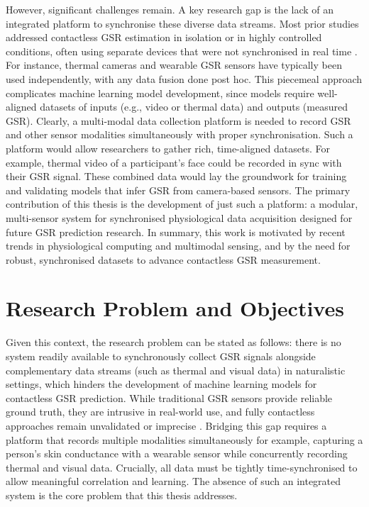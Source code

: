 However, significant challenges remain. A key research gap is the lack of an integrated platform to synchronise these diverse data streams. Most prior studies addressed contactless GSR estimation in isolation or in highly controlled conditions, often using separate devices that were not synchronised in real time \citep{ref7}. For instance, thermal cameras and wearable GSR sensors have typically been used independently, with any data fusion done post hoc. This piecemeal approach complicates machine learning model development, since models require well-aligned datasets of inputs (e.g., video or thermal data) and outputs (measured GSR). Clearly, a multi-modal data collection platform is needed to record GSR and other sensor modalities simultaneously with proper synchronisation. Such a platform would allow researchers to gather rich, time-aligned datasets. For example, thermal video of a participant's face could be recorded in sync with their GSR signal. These combined data would lay the groundwork for training and validating models that infer GSR from camera-based sensors. The primary contribution of this thesis is the development of just such a platform: a modular, multi-sensor system for synchronised physiological data acquisition designed for future GSR prediction research. In summary, this work is motivated by recent trends in physiological computing and multimodal sensing, and by the need for robust, synchronised datasets to advance contactless GSR measurement.


\section{Research Problem and Objectives}
Given this context, the research problem can be stated as follows: there is no system readily available to synchronously collect GSR signals alongside complementary data streams (such as thermal and visual data) in naturalistic settings, which hinders the development of machine learning models for contactless GSR prediction. While traditional GSR sensors provide reliable ground truth, they are intrusive in real-world use, and fully contactless approaches remain unvalidated or imprecise \citep{ref8}. Bridging this gap requires a platform that records multiple modalities simultaneously \textemdash for example, capturing a person's skin conductance with a wearable sensor while concurrently recording thermal and visual data. Crucially, all data must be tightly time-synchronised to allow meaningful correlation and learning. The absence of such an integrated system is the core problem that this thesis addresses.


